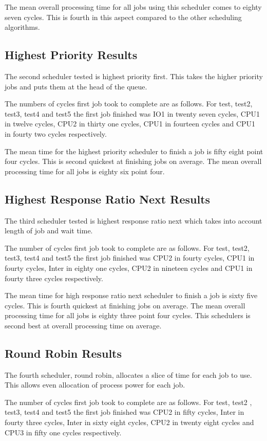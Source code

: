 \documentclass{acm_proc_article-sp}
\begin{document}
The mean overall processing time for all jobs using this scheduler comes to eighty seven cycles. This is fourth in this aspect compared to the other scheduling algorithms.

\subsection{Highest Priority Results}
The second scheduler tested is highest priority first. This takes the higher priority jobs and puts them at the head of the queue.

The numbers of cycles first job took to complete are as follows. For test, test2, test3, test4 and test5 the first job finished was IO1 in twenty seven cycles, CPU1 in twelve cycles, CPU2 in thirty one cycles, CPU1 in fourteen cycles and CPU1 in fourty two cycles respectively.

The mean time for the highest priority scheduler to finish a job is fifty eight point four cycles. This is second quickest at finishing jobs on average. The mean overall processing time for all jobs is eighty six point four.

\subsection{Highest Response Ratio Next Results}
The third scheduler tested is highest response ratio next which takes into account length of job and wait time.

The number of cycles first job took to complete are as follows. For test, test2, test3, test4 and test5 the first job finished was CPU2 in fourty cycles, CPU1 in fourty cycles, Inter in eighty one cycles, CPU2 in nineteen cycles and CPU1 in fourty three cycles respectively.

The mean time for high response ratio next scheduler to finish a job is sixty five cycles. This is fourth quickest at finishing jobs on average. The mean overall processing time for all jobs is eighty three point four cycles. This schedulers is second best at overall processing time on average.

\subsection{Round Robin Results}
The fourth scheduler, round robin, allocates a slice of time for each job to use. This allows even allocation of process power for each job.

The number of cycles first job took to complete are as follows. For test, test2
, test3, test4 and test5 the first job finished was CPU2 in fifty cycles, Inter in fourty three cycles, Inter in sixty eight cycles, CPU2 in twenty eight cycles and CPU3 in fifty one cycles respectively.
\end{document}
